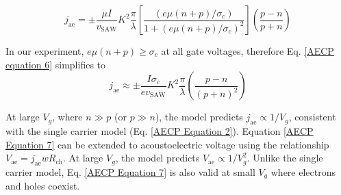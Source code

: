 \documentclass[double,12pt,1in,seploa]{beavtex}
\begin{document}
\begin{equation}
    j_{\mathrm{ae}} = \pm \frac{\mu I}{v_{\mathrm{SAW}}}K^2\frac{\pi}{\lambda}\left[\frac{(e\mu(n+p)/\sigma_c)}{1+ (e\mu(n+p)/\sigma_c)^2}\right]\left(\frac{p-n}{p+n}\right)
    \label{AECP Equation 6}
\end{equation}

In our experiment, $e\mu(n + p) \geq \sigma_c$ at all gate voltages, therefore Eq. \ref{AECP equation 6} simplifies to 
\begin{equation}
    j_{\mathrm{ae}} \approx \pm \frac{I \sigma_c}{e v_{\mathrm{SAW}}}K^2\frac{\pi}{\lambda}\left(\frac{p-n}{(p+n)^2}\right)
    \label{AECP Equation 7}
\end{equation}

At large $V_g$, where $n \gg p$ (or $p \gg n$), the model predicts $j_{\mathrm{ae}} \propto 1/V_g$, consistent with the single carrier model (Eq. \ref{AECP Equation 2}). Equation \ref{AECP Equation 7} can be extended to acoustoelectric voltage using the relationship $V_{\mathrm{ae}} = j_{\mathrm{ae}} w R_{\mathrm{ch}}$. At large $V_g$, the model predicts $V_{\mathrm{ae}} \propto 1/V_g^2$. Unlike the single carrier model, Eq. \ref{AECP Equation 7} is also valid at small $V_g$ where electrons and holes coexist. 
\end{document}
